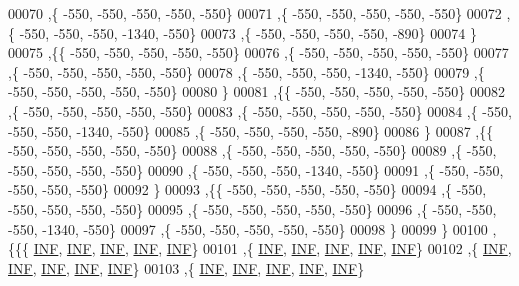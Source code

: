 \begin{DoxyCode}
00070   ,\{  -550,  -550,  -550,  -550,  -550\}
00071   ,\{  -550,  -550,  -550,  -550,  -550\}
00072   ,\{  -550,  -550,  -550, -1340,  -550\}
00073   ,\{  -550,  -550,  -550,  -550,  -890\}
00074   \}
00075  ,\{\{  -550,  -550,  -550,  -550,  -550\}
00076   ,\{  -550,  -550,  -550,  -550,  -550\}
00077   ,\{  -550,  -550,  -550,  -550,  -550\}
00078   ,\{  -550,  -550,  -550, -1340,  -550\}
00079   ,\{  -550,  -550,  -550,  -550,  -550\}
00080   \}
00081  ,\{\{  -550,  -550,  -550,  -550,  -550\}
00082   ,\{  -550,  -550,  -550,  -550,  -550\}
00083   ,\{  -550,  -550,  -550,  -550,  -550\}
00084   ,\{  -550,  -550,  -550, -1340,  -550\}
00085   ,\{  -550,  -550,  -550,  -550,  -890\}
00086   \}
00087  ,\{\{  -550,  -550,  -550,  -550,  -550\}
00088   ,\{  -550,  -550,  -550,  -550,  -550\}
00089   ,\{  -550,  -550,  -550,  -550,  -550\}
00090   ,\{  -550,  -550,  -550, -1340,  -550\}
00091   ,\{  -550,  -550,  -550,  -550,  -550\}
00092   \}
00093  ,\{\{  -550,  -550,  -550,  -550,  -550\}
00094   ,\{  -550,  -550,  -550,  -550,  -550\}
00095   ,\{  -550,  -550,  -550,  -550,  -550\}
00096   ,\{  -550,  -550,  -550, -1340,  -550\}
00097   ,\{  -550,  -550,  -550,  -550,  -550\}
00098   \}
00099  \}
00100 ,\{\{\{   \mbox{\hyperlink{energy__const_8h_a12c2040f25d8e3a7b9e1c2024c618cb6}{INF}},   \mbox{\hyperlink{energy__const_8h_a12c2040f25d8e3a7b9e1c2024c618cb6}{INF}},   \mbox{\hyperlink{energy__const_8h_a12c2040f25d8e3a7b9e1c2024c618cb6}{INF}},   \mbox{\hyperlink{energy__const_8h_a12c2040f25d8e3a7b9e1c2024c618cb6}{INF}},   \mbox{\hyperlink{energy__const_8h_a12c2040f25d8e3a7b9e1c2024c618cb6}{INF}}\}
00101   ,\{   \mbox{\hyperlink{energy__const_8h_a12c2040f25d8e3a7b9e1c2024c618cb6}{INF}},   \mbox{\hyperlink{energy__const_8h_a12c2040f25d8e3a7b9e1c2024c618cb6}{INF}},   \mbox{\hyperlink{energy__const_8h_a12c2040f25d8e3a7b9e1c2024c618cb6}{INF}},   \mbox{\hyperlink{energy__const_8h_a12c2040f25d8e3a7b9e1c2024c618cb6}{INF}},   \mbox{\hyperlink{energy__const_8h_a12c2040f25d8e3a7b9e1c2024c618cb6}{INF}}\}
00102   ,\{   \mbox{\hyperlink{energy__const_8h_a12c2040f25d8e3a7b9e1c2024c618cb6}{INF}},   \mbox{\hyperlink{energy__const_8h_a12c2040f25d8e3a7b9e1c2024c618cb6}{INF}},   \mbox{\hyperlink{energy__const_8h_a12c2040f25d8e3a7b9e1c2024c618cb6}{INF}},   \mbox{\hyperlink{energy__const_8h_a12c2040f25d8e3a7b9e1c2024c618cb6}{INF}},   \mbox{\hyperlink{energy__const_8h_a12c2040f25d8e3a7b9e1c2024c618cb6}{INF}}\}
00103   ,\{   \mbox{\hyperlink{energy__const_8h_a12c2040f25d8e3a7b9e1c2024c618cb6}{INF}},   \mbox{\hyperlink{energy__const_8h_a12c2040f25d8e3a7b9e1c2024c618cb6}{INF}},   \mbox{\hyperlink{energy__const_8h_a12c2040f25d8e3a7b9e1c2024c618cb6}{INF}},   \mbox{\hyperlink{energy__const_8h_a12c2040f25d8e3a7b9e1c2024c618cb6}{INF}},   \mbox{\hyperlink{energy__const_8h_a12c2040f25d8e3a7b9e1c2024c618cb6}{INF}}\}

\end{DoxyCode}
